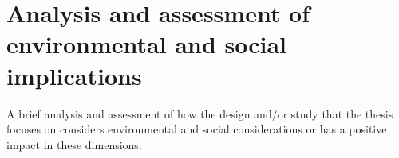\chapter{Analysis and assessment of environmental and social implications}

A brief analysis and assessment of how the design and/or study that the thesis focuses on considers environmental and social considerations or has a positive impact in these dimensions.
